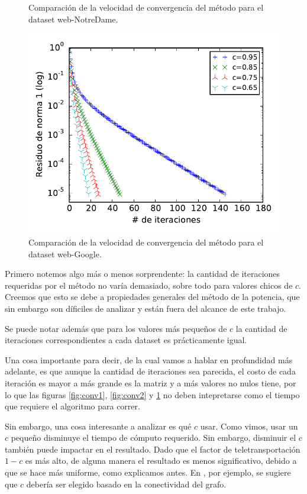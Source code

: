 \begin{figure}[H]
\begin{minipage}{0.48\textwidth}
  \caption{\footnotesize{Comparación de la velocidad de convergencia del método para el dataset web-NotreDame.}}
  \label{fig:conv2}
\end{minipage}
\begin{minipage}{0.5\textwidth}
  \centering
    \includegraphics[width=1\textwidth]{imgs/convergencia-google.pdf}
  \caption{\footnotesize{Comparación de la velocidad de convergencia del método para el dataset web-Google.}}
  \label{fig:conv3}
\end{minipage}
\end{figure}


Primero notemos algo más o menos sorprendente: la cantidad de iteraciones requeridas por el método no varía demasiado, sobre todo para valores chicos de $c$. Creemos que esto se debe a propiedades generales del método de la potencia, que sin embargo son díficiles de analizar y están fuera del alcance de este trabajo.

Se puede notar además que para los valores más pequeños de $c$ la cantidad de iteraciones correspondientes a cada dataset es prácticamente igual.

Una cosa importante para decir, de la cual vamos a hablar en profundidad más adelante, es que aunque la cantidad de iteraciones sea parecida, el costo de cada iteración es mayor a más grande es la matriz y a más valores no nulos tiene, por lo que las figuras \ref{fig:conv1}, \ref{fig:conv2} y \ref{fig:conv3} no deben intepretarse como el tiempo que requiere el algoritmo para correr.

Sin embargo, una cosa interesante a analizar es qué $c$ usar. Como vimos, usar un $c$ pequeño disminuye el tiempo de cómputo requerido. Sin embargo, disminuir el $c$ también puede impactar en el resultado. Dado que el factor de teletransportación $1-c$ es más alto, de alguna manera el resultado es menos significativo, debido a que se hace más uniforme, como explicamos antes. 
En \cite{Chakrabarti}, por ejemplo, se sugiere que $c$ debería ser elegido basado en la conectividad del grafo.

